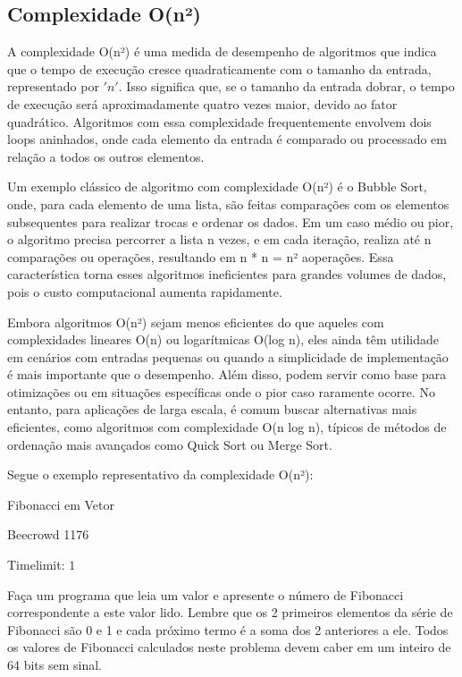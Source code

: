 \subsection{Complexidade O(n²)}

A complexidade O(n²) é uma medida de desempenho de algoritmos que indica que o tempo de execução cresce quadraticamente com o tamanho da entrada, representado por $'n'$. Isso significa que, se o tamanho da entrada dobrar, o tempo de execução será aproximadamente quatro vezes maior, devido ao fator quadrático. Algoritmos com essa complexidade frequentemente envolvem dois loops aninhados, onde cada elemento da entrada é comparado ou processado em relação a todos os outros elementos.

Um exemplo clássico de algoritmo com complexidade O(n²) é o Bubble Sort, onde, para cada elemento de uma lista, são feitas comparações com os elementos subsequentes para realizar trocas e ordenar os dados. Em um caso médio ou pior, o algoritmo precisa percorrer a lista n vezes, e em cada iteração, realiza até n comparações ou operações, resultando em n * n = n² aoperações. Essa característica torna esses algoritmos ineficientes para grandes volumes de dados, pois o custo computacional aumenta rapidamente.

Embora algoritmos O(n²) sejam menos eficientes do que aqueles com complexidades lineares O(n) ou logarítmicas O(log n), eles ainda têm utilidade em cenários com entradas pequenas ou quando a simplicidade de implementação é mais importante que o desempenho. Além disso, podem servir como base para otimizações ou em situações específicas onde o pior caso raramente ocorre. No entanto, para aplicações de larga escala, é comum buscar alternativas mais eficientes, como algoritmos com complexidade O(n log n), típicos de métodos de ordenação mais avançados como Quick Sort ou Merge Sort.

Segue o exemplo representativo da complexidade O(n²):
\begin{center}
Fibonacci em Vetor

{Beecrowd 1176}

Timelimit: $1$	
\end{center}

Faça um programa que leia um valor e apresente o número de Fibonacci correspondente a este valor lido. Lembre que os 2 primeiros elementos da série de Fibonacci são 0 e 1 e cada próximo termo é a soma dos 2 anteriores a ele. Todos os valores de Fibonacci calculados neste problema devem caber em um inteiro de 64 bits sem sinal.


